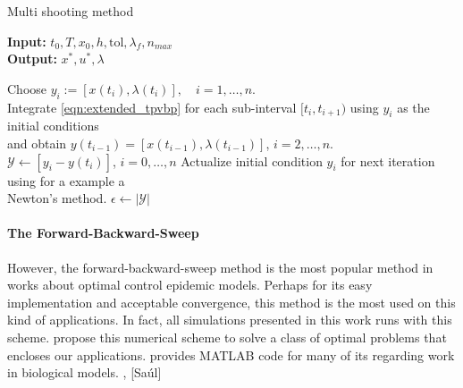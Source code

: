 \begin{algorithm}
  \caption{Multi shooting method } \label{alg:multishooting}
  \begin{flushleft}
    \hspace*{\algorithmicindent} \textbf{Input:} 
    $t_0, T, x_0, h, \text{tol}, \lambda_{f}, n_{max}$ \\
    \hspace*{\algorithmicindent} \textbf{Output:} 
    $x^*, u^*, \lambda$
  \end{flushleft}
  \begin{algorithmic}
        \State 
         Choose $y_i := [x(t_i ), \lambda(t_i )], \quad i = 1,\dots, n$.
        \\
        \State 
          Integrate \eqref{eqn:extended_tpvbp} for each sub-interval 
          $[t_i , t_{i+1})$ using $y_i$ as the initial conditions 
          \\
          \hspace{.98cm}
          and obtain 
          $y(t_{i−1}) = [x(t_{i−1}), \lambda(t_{i−1})]$, 
          $i=2, \dots, n$.
        \\
        \State 
          $\mathcal{Y} \gets [y_i - y(t_i)]$, $i=0, \dots, n$
        \State
          Actualize initial condition $y_i$ for next iteration
          using for a example a
          \\
          \hspace{.98cm}
           Newton's method.
        \State
          $\epsilon \gets |\mathcal{Y}|$  
      \EndWhile
     \EndProcedure
  \end{algorithmic}
\end{algorithm}

\paragraph{The Forward-Backward-Sweep}
  However, the forward-backward-sweep method is the most popular method in 
  works about optimal control epidemic models. Perhaps for its easy 
  implementation and acceptable convergence, this method is the most used
  on this kind of applications. In fact, all simulations presented in this work
  runs with this scheme. \citet{hackbusch1978numerical} propose this numerical
  scheme to solve a class of optimal problems that encloses our applications.
  \citet{lenhart2007optimal} provides MATLAB code for many of its regarding
  work in biological models.
\cite*{Pesch1989} , [Saúl]
